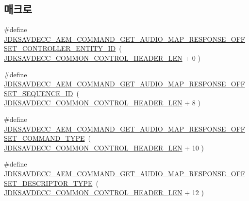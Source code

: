 \subsection*{매크로}
\begin{DoxyCompactItemize}
\item 
\#define \hyperlink{group__command__get__audio__map__response_gaa9f87f45fa513ce8da5bcf482e229c6a}{J\+D\+K\+S\+A\+V\+D\+E\+C\+C\+\_\+\+A\+E\+M\+\_\+\+C\+O\+M\+M\+A\+N\+D\+\_\+\+G\+E\+T\+\_\+\+A\+U\+D\+I\+O\+\_\+\+M\+A\+P\+\_\+\+R\+E\+S\+P\+O\+N\+S\+E\+\_\+\+O\+F\+F\+S\+E\+T\+\_\+\+C\+O\+N\+T\+R\+O\+L\+L\+E\+R\+\_\+\+E\+N\+T\+I\+T\+Y\+\_\+\+ID}~( \hyperlink{group__jdksavdecc__avtp__common__control__header_gaae84052886fb1bb42f3bc5f85b741dff}{J\+D\+K\+S\+A\+V\+D\+E\+C\+C\+\_\+\+C\+O\+M\+M\+O\+N\+\_\+\+C\+O\+N\+T\+R\+O\+L\+\_\+\+H\+E\+A\+D\+E\+R\+\_\+\+L\+EN} + 0 )
\item 
\#define \hyperlink{group__command__get__audio__map__response_ga83f76579e2b6ec0e940dac95ff7d1bd5}{J\+D\+K\+S\+A\+V\+D\+E\+C\+C\+\_\+\+A\+E\+M\+\_\+\+C\+O\+M\+M\+A\+N\+D\+\_\+\+G\+E\+T\+\_\+\+A\+U\+D\+I\+O\+\_\+\+M\+A\+P\+\_\+\+R\+E\+S\+P\+O\+N\+S\+E\+\_\+\+O\+F\+F\+S\+E\+T\+\_\+\+S\+E\+Q\+U\+E\+N\+C\+E\+\_\+\+ID}~( \hyperlink{group__jdksavdecc__avtp__common__control__header_gaae84052886fb1bb42f3bc5f85b741dff}{J\+D\+K\+S\+A\+V\+D\+E\+C\+C\+\_\+\+C\+O\+M\+M\+O\+N\+\_\+\+C\+O\+N\+T\+R\+O\+L\+\_\+\+H\+E\+A\+D\+E\+R\+\_\+\+L\+EN} + 8 )
\item 
\#define \hyperlink{group__command__get__audio__map__response_ga4262ffe4af4bf1b44bc98e9d18edac62}{J\+D\+K\+S\+A\+V\+D\+E\+C\+C\+\_\+\+A\+E\+M\+\_\+\+C\+O\+M\+M\+A\+N\+D\+\_\+\+G\+E\+T\+\_\+\+A\+U\+D\+I\+O\+\_\+\+M\+A\+P\+\_\+\+R\+E\+S\+P\+O\+N\+S\+E\+\_\+\+O\+F\+F\+S\+E\+T\+\_\+\+C\+O\+M\+M\+A\+N\+D\+\_\+\+T\+Y\+PE}~( \hyperlink{group__jdksavdecc__avtp__common__control__header_gaae84052886fb1bb42f3bc5f85b741dff}{J\+D\+K\+S\+A\+V\+D\+E\+C\+C\+\_\+\+C\+O\+M\+M\+O\+N\+\_\+\+C\+O\+N\+T\+R\+O\+L\+\_\+\+H\+E\+A\+D\+E\+R\+\_\+\+L\+EN} + 10 )
\item 
\#define \hyperlink{group__command__get__audio__map__response_ga245a941a6833733de1d791310917d2fb}{J\+D\+K\+S\+A\+V\+D\+E\+C\+C\+\_\+\+A\+E\+M\+\_\+\+C\+O\+M\+M\+A\+N\+D\+\_\+\+G\+E\+T\+\_\+\+A\+U\+D\+I\+O\+\_\+\+M\+A\+P\+\_\+\+R\+E\+S\+P\+O\+N\+S\+E\+\_\+\+O\+F\+F\+S\+E\+T\+\_\+\+D\+E\+S\+C\+R\+I\+P\+T\+O\+R\+\_\+\+T\+Y\+PE}~( \hyperlink{group__jdksavdecc__avtp__common__control__header_gaae84052886fb1bb42f3bc5f85b741dff}{J\+D\+K\+S\+A\+V\+D\+E\+C\+C\+\_\+\+C\+O\+M\+M\+O\+N\+\_\+\+C\+O\+N\+T\+R\+O\+L\+\_\+\+H\+E\+A\+D\+E\+R\+\_\+\+L\+EN} + 12 )

\end{DoxyCompactItemize}

